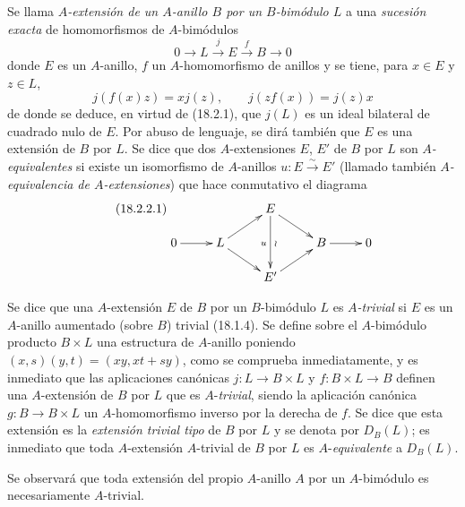 \begin{env}[18.2.2]
\label{0.18.2.2-fr}
Se llama \emph{$A$-extensión de un $A$-anillo $B$ por un $B$-bimódulo $L$}
a una \emph{sucesión exacta} de homomorfismos de $A$-bimódulos
\[
  0\longrightarrow L\xrightarrow{j}E\xrightarrow{f}B\longrightarrow0
\]
donde $E$ es un $A$-anillo, $f$ un $A$-homomorfismo de anillos y se tiene, para
$x\in E$ y $z\in L$,
\[
  j(f(x)z)=xj(z),\qquad j(zf(x))=j(z)x
\]
de donde se deduce, en virtud de (18.2.1), que $j(L)$ es un ideal bilateral de cuadrado nulo de $E$.
Por abuso de lenguaje, se dirá también que $E$ es una extensión de $B$ por $L$.
Se dice que dos $A$-extensiones $E$, $E'$ de $B$ por $L$ son
\emph{$A$-equivalentes} si existe un isomorfismo de $A$-anillos
$u:E\xrightarrow{\sim}E'$ (llamado también \emph{$A$-equivalencia de
$A$-extensiones}) que hace conmutativo el diagrama
\begin{equation}
\label{0.18.2.2.1-fr}
\tag{18.2.2.1}
  \xymatrix@C=2.1pc@R=1.2pc{
    & & E\ar[dr]\ar[dd]_u^{\wr} & & \\
    0\ar[r] & L\ar[ur]\ar[dr] & & B\ar[r] & 0\\
    & & E'\ar[ur] & &
  }
\end{equation}
\end{env}


\begin{env}[18.2.3]
\label{0.18.2.3-fr}
Se dice que una $A$-extensión $E$ de $B$ por un $B$-bimódulo $L$ es
\emph{$A$-trivial} si $E$ es un $A$-anillo aumentado (sobre $B$) trivial
(18.1.4). Se define sobre el $A$-bimódulo producto $B\times L$ una estructura de
$A$-anillo poniendo $(x,s)(y,t)=(xy,xt+sy)$, como se comprueba inmediatamente,
y es inmediato que las aplicaciones canónicas $j:L\to B\times L$ y
$f:B\times L\to B$ definen una $A$-extensión de $B$ por $L$ que es
$A$-\emph{trivial}, siendo la aplicación canónica $g:B\to B\times L$ un
$A$-homomorfismo inverso por la derecha de $f$. Se dice que esta extensión es
la \emph{extensión trivial tipo} de $B$ por $L$ y se denota por $D_B(L)$; es
inmediato que toda $A$-extensión $A$-trivial de $B$ por $L$ es
$A$-\emph{equivalente} a $D_B(L)$.

Se observará que toda extensión del propio $A$-anillo $A$ por un $A$-bimódulo
es necesariamente $A$-trivial.
\end{env}

